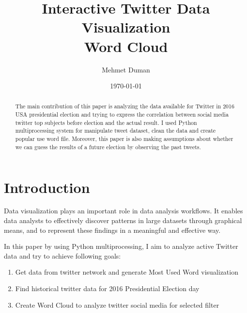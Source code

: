 \documentclass[12pt,notitlepage]{article}
\begin{document}
\title{Interactive Twitter Data Visualization \\
Word Cloud}

\author[1]{Mehmet Duman} 


\date{\today}

\maketitle

\begin{abstract}
The main contribution of this paper is analyzing the data available for Twitter in 2016 USA 
presidential election and trying to express the correlation between social media twitter top subjects before election and the actual result. I used Python multiprocessing system for manipulate tweet dataset, clean the data and create popular use word file. Moreover, this paper is also making assumptions about whether we can guess the results of a future election by observing the past tweets.

\end{abstract}



\newpage

\section{Introduction}

Data visualization plays an important role in data analysis workflows. It enables data analysts to effectively discover patterns in large datasets through graphical means, and to represent these findings in a meaningful and effective way. 

In this paper by using Python multiprocessing, I aim to analyze active Twitter data and try to achieve following goals:

\begin{enumerate}
\item Get data from twitter network and generate Most Used Word visualization
\item Find historical twitter data for 2016 Presidential Election day 
\item Create Word Cloud to analyze twitter social media for selected filter
\end{enumerate}
\end{document}

